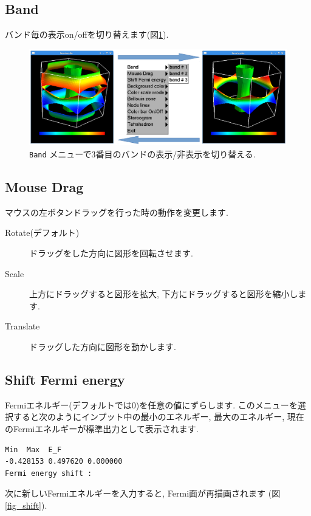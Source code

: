 \documentclass[12pt]{jarticle}
\begin{document}
\subsection{Band}

バンド毎の表示on/offを切り替えます(図\ref{fig_band}).

\begin{figure}[!ht]
  \includegraphics[width=17cm]{figs/band.eps}
  \caption{\texttt{Band} メニューで3番目のバンドの表示/非表示を切り替える.}
  \label{fig_band}
\end{figure}

\subsection{Mouse Drag}

マウスの左ボタンドラッグを行った時の動作を変更します.

\begin{description}
\item[Rotate(デフォルト)] ドラッグをした方向に図形を回転させます.
\item[Scale] 上方にドラッグすると図形を拡大, 下方にドラッグすると図形を縮小します.
\item[Translate] ドラッグした方向に図形を動かします.
\end{description}

\subsection{Shift Fermi energy}

Fermiエネルギー(デフォルトでは0)を任意の値にずらします.
このメニューを選択すると次のようにインプット中の最小のエネルギー, 
最大のエネルギー, 
現在のFermiエネルギーが標準出力として表示されます. 
\begin{verbatim}
Min  Max  E_F 
-0.428153 0.497620 0.000000 
Fermi energy shift : 
\end{verbatim}
次に新しいFermiエネルギーを入力すると, 
Fermi面が再描画されます (図\ref{fig_shift}).
\end{document}
